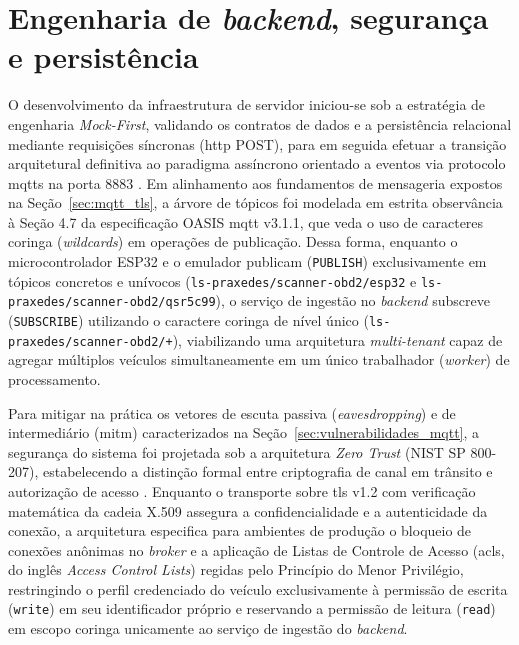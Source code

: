 \documentclass[
	12pt,				%
	openright,			%
	twoside,			%
	a4paper,			%
	english,			%
	brazil				%
	]{abntex2}
\begin{document}
\section{Engenharia de \textit{backend}, segurança e persistência}

O desenvolvimento da infraestrutura de servidor iniciou-se sob a estratégia de
engenharia \textit{Mock-First}, validando os contratos de dados e a persistência
relacional mediante requisições síncronas (\acrshort{http} POST), para em seguida
efetuar a transição arquitetural definitiva ao paradigma assíncrono orientado a eventos
via protocolo \acrshort{mqtts} na porta 8883 \cite{oasis2014,iso20922}. Em alinhamento
aos fundamentos de mensageria expostos na Seção~\ref{sec:mqtt_tls}, a árvore de tópicos
foi modelada em estrita observância à Seção 4.7 da especificação OASIS \acrshort{mqtt}
v3.1.1, que veda o uso de caracteres coringa (\textit{wildcards}) em operações de
publicação. Dessa forma, enquanto o microcontrolador ESP32 e o emulador publicam
(\texttt{PUBLISH}) exclusivamente em tópicos concretos e unívocos
(\texttt{ls-praxedes/\allowbreak scanner-obd2/\allowbreak esp32} e
\texttt{ls-praxedes/\allowbreak scanner-obd2/\allowbreak qsr5c99}), o serviço de
ingestão no \textit{backend} subscreve (\texttt{SUBSCRIBE}) utilizando o caractere
coringa de nível único (\texttt{ls-praxedes/\allowbreak scanner-obd2/+}), viabilizando
uma arquitetura \textit{multi-tenant} capaz de agregar múltiplos veículos
simultaneamente em um único trabalhador (\textit{worker}) de processamento.

Para mitigar na prática os vetores de escuta passiva (\textit{eavesdropping}) e de
intermediário (\acrshort{mitm}) caracterizados na Seção~\ref{sec:vulnerabilidades_mqtt},
a segurança do sistema foi projetada sob a arquitetura \textit{Zero Trust} (NIST SP
800-207), estabelecendo a distinção formal entre criptografia de canal em trânsito e
autorização de acesso \cite{rose2020,baars2018}. Enquanto o transporte sobre
\acrshort{tls} v1.2 com verificação matemática da cadeia X.509 assegura a
confidencialidade e a autenticidade da conexão, a arquitetura especifica para ambientes
de produção o bloqueio de conexões anônimas no \textit{broker} e a aplicação de Listas
de Controle de Acesso (\acrshort{acl}s, do inglês \textit{Access Control Lists}) regidas
pelo Princípio do Menor Privilégio, restringindo o perfil credenciado do veículo
exclusivamente à permissão de escrita (\texttt{write}) em seu identificador próprio e
reservando a permissão de leitura (\texttt{read}) em escopo coringa unicamente ao
serviço de ingestão do \textit{backend}.
\end{document}
